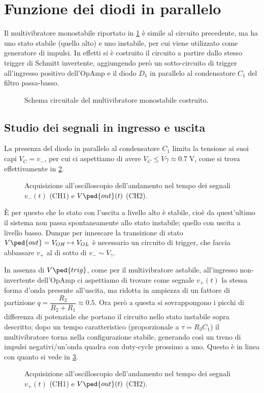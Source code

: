 \documentclass[10pt, a4paper, italian]{article}
\begin{document}
\section{Funzione dei diodi in parallelo}
Il multivibratore monostabile riportato in \cref{fig: mstableschm} è simile
al circuito precedente, ma ha uno stato stabile (quello alto) e uno instabile,
per cui viene utilizzato come generatore di impulsi. In effetti si è costruito
il circuito a partire dallo stesso trigger di Schmitt invertente, aggiungendo
però un sotto-circuito di trigger all'ingresso positivo dell'OpAmp e il diodo
$D_1$ in parallelo al condensatore $C_1$ del filtro passa-basso.
\begin{figure}[htbp]
    \centering
    \caption{Schema circuitale del multivibratore monostabile costruito.
    \label{fig: mstableschm}}
\end{figure}

\subsection{Studio dei segnali in ingresso e uscita}
La presenza del diodo in parallelo al condensatore $C_1$ limita la tensione
ai suoi capi $V_C = v_-$, per cui ci aspettiamo di avere
$V_C \leq V\gamma \approx 0.7 \; \si{\V}$, come si trova effettivamente in
\cref{fig: mstabilev-}.
\begin{figure}[htbp]
	\centering
	\caption{Acquisizione all'oscilloscopio dell'andamento nel tempo dei
	segnali $v_- (t)$ (CH1) e $V\ped{out} (t)$ (CH2). \label{fig: mstabilev-}}
\end{figure}

\`E per questo che lo stato con l'uscita a livello alto è stabile,
cioè da quest'ultimo il sistema non passa spontaneamente allo stato instabile;
quello con uscita a livello basso.
Dunque per innescare la transizione di stato
$V\ped{out} = V_{OH} \mapsto V_{OL}$ è necessario un circuito di trigger,
che faccia abbassare $v_+$ al di sotto di $v_- \sim V_\gamma$.

In assenza di $V\ped{trig}$, come per il multivibratore astabile, all'ingresso
non-invertente dell'OpAmp ci aspettiamo di trovare come segnale $v_+ (t)$ la
stessa forma d'onda presente all'uscita, ma ridotta in ampiezza di un fattore di partizione $q = \dfrac{R_2}{R_2 + R_1} \approx 0.5$.
Ora però a questa si sovrappongono i picchi di differenza di potenziale che
portano il circuito nello stato instabile sopra descritto; dopo un tempo
caratteristico (proporzionale a $\tau = R_3 C_1$) il multivibratore torna
nella configurazione stabile, generando così un treno di impulsi
negativi/un'onda quadra con duty-cycle prossimo a uno.
Questo è in linea con quanto si vede in \cref{fig: mstabilev+}.
\begin{figure}[htbp]
	\centering
	\caption{Acquisizione all'oscilloscopio dell'andamento nel tempo dei
	segnali $v_+ (t)$ (CH1) e $V\ped{out} (t)$ (CH2). \label{fig: mstabilev+}}
\end{figure}
\end{document}
